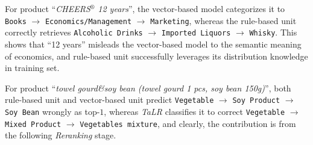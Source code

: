 For product ``\textit{CHEERS$^\circledR$ 12 years}'', the vector-based model categorizes it to \verb|Books| $\rightarrow$ \verb|Economics/Management| $\rightarrow$ \verb|Marketing|, whereas the rule-based unit correctly retrieves \verb|Alcoholic Drinks| $\rightarrow$ \verb|Imported Liquors| $\rightarrow$ \verb|Whisky|. This shows that ``12 years'' misleads the vector-based model to the semantic meaning of economics, and rule-based unit successfully leverages its distribution knowledge in training set.

For product ``\textit{towel gourd\&soy bean (towel gourd 1 pcs, soy bean 150g)}'', both rule-based unit and vector-based unit predict
\verb|Vegetable| $\rightarrow$ \verb|Soy Product| $\rightarrow$ \verb|Soy Bean| wrongly as top-$1$, whereas \textit{TaLR} classifies it to correct \verb|Vegetable| $\rightarrow$ \verb|Mixed Product| $\rightarrow$ \texttt{Vegetables mixture}, and clearly, the contribution is from the following \textit{Reranking} stage.
